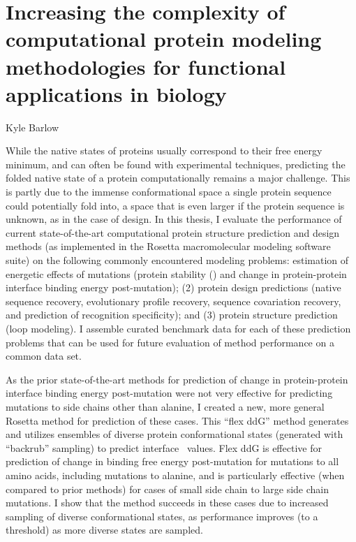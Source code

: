 \chapter*{\centering Increasing the complexity of computational protein modeling methodologies for functional applications in biology}

\begin{center}
  { \large Kyle Barlow }
\end{center}

While the native states of proteins usually correspond to their free energy minimum, and can often be found with experimental techniques, predicting the folded native state of a protein computationally remains a major challenge. This is partly due to the immense conformational space a single protein sequence could potentially fold into, a space that is even larger if the protein sequence is unknown, as in the case of design. In this thesis, I evaluate the performance of current state-of-the-art computational protein structure prediction and design methods (as implemented in the Rosetta macromolecular modeling software suite) on the following commonly encountered modeling problems: estimation of energetic effects of mutations (protein stability (\ddg) and change in protein-protein interface binding energy post-mutation); (2) protein design predictions (native sequence recovery, evolutionary profile recovery, sequence covariation recovery, and prediction of recognition specificity); and (3) protein structure prediction (loop modeling). I assemble curated benchmark data for each of these prediction problems that can be used for future evaluation of method performance on a common data set.

As the prior state-of-the-art methods for prediction of change in protein-protein interface binding energy post-mutation were not very effective for predicting mutations to side chains other than alanine, I created a new, more general Rosetta method for prediction of these cases. This “flex ddG” method generates and utilizes ensembles of diverse protein conformational states (generated with “backrub” sampling) to predict interface \ddg\ values. Flex ddG is effective for prediction of change in binding free energy post-mutation for mutations to all amino acids, including mutations to alanine, and is particularly effective (when compared to prior methods) for cases of small side chain to large side chain mutations. I show that the method succeeds in these cases due to increased sampling of diverse conformational states, as performance improves (to a threshold) as more diverse states are sampled.
